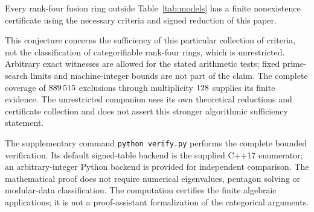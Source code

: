 \begin{conjecture}\label{conj:criteria}
Every rank-four fusion ring outside Table~\ref{tab:models} has a finite
nonexistence certificate using the necessary criteria and signed reduction
of this paper.
\end{conjecture}
This conjecture concerns the sufficiency of this particular collection of
criteria, not the classification of categorifiable rank-four rings, which
is unrestricted. Arbitrary exact witnesses are allowed for the stated
arithmetic tests; fixed prime-search limits and machine-integer bounds are
not part of the claim. The complete coverage of $889\,515$ exclusions
through multiplicity $128$ supplies its finite evidence.
The unrestricted companion uses its own theoretical reductions and
certificate collection and does not assert this stronger algorithmic
sufficiency statement.

The supplementary command \texttt{python verify.py} performs the complete
bounded verification. Its default signed-table backend is the supplied C++17 enumerator;
an arbitrary-integer Python backend is provided for independent comparison. The mathematical proof does
not require numerical eigenvalues, pentagon solving or modular-data
classification. The computation certifies the finite algebraic
applications; it is not a proof-assistant formalization of the categorical
arguments.
